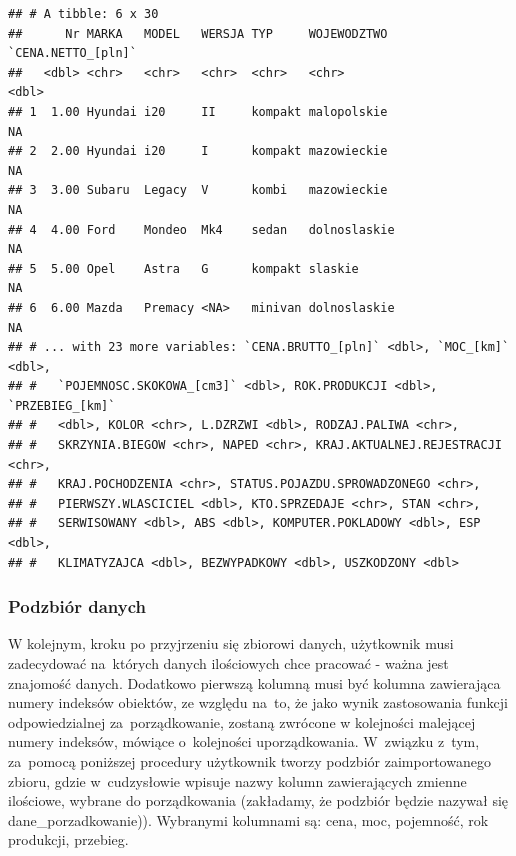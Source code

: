 \documentclass[12pt,a4paper]{report}
\begin{document}
{\begin{verbatim}
## # A tibble: 6 x 30
##      Nr MARKA   MODEL   WERSJA TYP     WOJEWODZTWO  `CENA.NETTO_[pln]`
##   <dbl> <chr>   <chr>   <chr>  <chr>   <chr>                     <dbl>
## 1  1.00 Hyundai i20     II     kompakt malopolskie                  NA
## 2  2.00 Hyundai i20     I      kompakt mazowieckie                  NA
## 3  3.00 Subaru  Legacy  V      kombi   mazowieckie                  NA
## 4  4.00 Ford    Mondeo  Mk4    sedan   dolnoslaskie                 NA
## 5  5.00 Opel    Astra   G      kompakt slaskie                      NA
## 6  6.00 Mazda   Premacy <NA>   minivan dolnoslaskie                 NA
## # ... with 23 more variables: `CENA.BRUTTO_[pln]` <dbl>, `MOC_[km]` <dbl>,
## #   `POJEMNOSC.SKOKOWA_[cm3]` <dbl>, ROK.PRODUKCJI <dbl>, `PRZEBIEG_[km]`
## #   <dbl>, KOLOR <chr>, L.DZRZWI <dbl>, RODZAJ.PALIWA <chr>,
## #   SKRZYNIA.BIEGOW <chr>, NAPED <chr>, KRAJ.AKTUALNEJ.REJESTRACJI <chr>,
## #   KRAJ.POCHODZENIA <chr>, STATUS.POJAZDU.SPROWADZONEGO <chr>,
## #   PIERWSZY.WLASCICIEL <dbl>, KTO.SPRZEDAJE <chr>, STAN <chr>,
## #   SERWISOWANY <dbl>, ABS <dbl>, KOMPUTER.POKLADOWY <dbl>, ESP <dbl>,
## #   KLIMATYZAJCA <dbl>, BEZWYPADKOWY <dbl>, USZKODZONY <dbl>
\end{verbatim}

\subsubsection{Podzbiór danych}

W kolejnym, kroku po przyjrzeniu się zbiorowi danych, użytkownik musi
zadecydować na~których danych ilościowych chce pracować - ważna jest
znajomość danych. Dodatkowo pierwszą kolumną musi być kolumna
zawierająca numery indeksów obiektów, ze względu na~to, że jako wynik
zastosowania funkcji odpowiedzialnej za~porządkowanie, zostaną zwrócone
w kolejności malejącej numery indeksów, mówiące o~kolejności
uporządkowania. W~związku z~tym, za~pomocą poniższej procedury
użytkownik tworzy podzbiór zaimportowanego zbioru, gdzie w~cudzysłowie
wpisuje nazwy kolumn zawierających zmienne ilościowe, wybrane do
porządkowania (zakładamy, że podzbiór będzie nazywał się
dane\_porzadkowanie)). Wybranymi kolumnami są: cena, moc, pojemność, rok produkcji,
przebieg.

\begin{Shaded}
\begin{Highlighting}[]
\NormalTok{dane_porzadkowanie<-zbior_danych[}\NormalTok{(}\NormalTok{,}\NormalTok{,}\NormalTok{,}
                                   \NormalTok{,}
                                  \NormalTok{,}\NormalTok{)]}
\end{Highlighting}
\end{Shaded}

}
\end{document}
